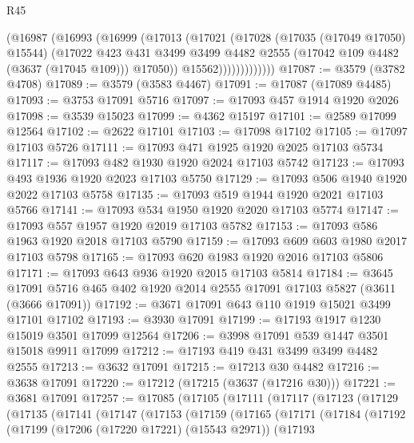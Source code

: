 \begin{lexlean}{R45}
\begin{coremodule}
                    (@16987
                      (@16993
                        (@16999
                          (@17013
                            (@17021
                              (@17028
                                (@17035 (@17049 @17050) @15544)
                                (@17022
                                  @423
                                  @431
                                  @3499
                                  @3499
                                  @4482
                                  @2555
                                  (@17042 @109 @4482 (@3637 (@17045 @109)))
                                  @17050))
                              @15562)))))))))))))
@17087 := @3579 (@3782 @4708)
@17089 := @3579 (@3583 @4467)
@17091 := @17087 (@17089 @4485)
@17093 := @3753 @17091 @5716
@17097 := @17093 @457 @1914 @1920 @2026
@17098 := @3539 @15023
@17099 := @4362 @15197
@17101 := @2589 @17099 @12564
@17102 := @2622 @17101
@17103 := @17098 @17102
@17105 := @17097 @17103 @5726
@17111 := @17093 @471 @1925 @1920 @2025 @17103 @5734
@17117 := @17093 @482 @1930 @1920 @2024 @17103 @5742
@17123 := @17093 @493 @1936 @1920 @2023 @17103 @5750
@17129 := @17093 @506 @1940 @1920 @2022 @17103 @5758
@17135 := @17093 @519 @1944 @1920 @2021 @17103 @5766
@17141 := @17093 @534 @1950 @1920 @2020 @17103 @5774
@17147 := @17093 @557 @1957 @1920 @2019 @17103 @5782
@17153 := @17093 @586 @1963 @1920 @2018 @17103 @5790
@17159 := @17093 @609 @603 @1980 @2017 @17103 @5798
@17165 := @17093 @620 @1983 @1920 @2016 @17103 @5806
@17171 := @17093 @643 @936 @1920 @2015 @17103 @5814
@17184 := @3645 @17091 @5716 @465 @402 @1920 @2014 @2555 @17091 @17103 @5827 (@3611 (@3666 @17091))
@17192 := @3671 @17091 @643 @110 @1919 @15021 @3499 @17101 @17102
@17193 := @3930 @17091
@17199 := @17193 @1917 @1230 @15019 @3501 @17099 @12564
@17206 := @3998 @17091 @539 @1447 @3501 @15018 @9911 @17099
@17212 := @17193 @419 @431 @3499 @3499 @4482 @2555
@17213 := @3632 @17091
@17215 := @17213 @30 @4482
@17216 := @3638 @17091
@17220 := @17212 (@17215 (@3637 (@17216 @30)))
@17221 := @3681 @17091
@17257 := @17085
    (@17105
      (@17111
        (@17117
          (@17123
            (@17129
              (@17135
                (@17141
                  (@17147
                    (@17153
                      (@17159
                        (@17165
                          (@17171
                            (@17184
                              (@17192
                                (@17199
                                  (@17206 (@17220 @17221) (@15543 @2971))
                                  (@17193

\end{coremodule}
\end{lexlean}
